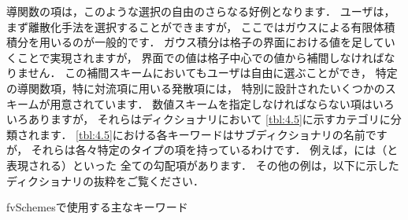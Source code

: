 導関数の項は，このような選択の自由のさらなる好例となります．
ユーザは，まず離散化手法を選択することができますが，
ここではガウスによる有限体積積分を用いるのが一般的です．
ガウス積分は格子の界面における値を足していくことで実現されますが，
界面での値は格子中心での値から補間しなければなりません．
この補間スキームにおいてもユーザは自由に選ぶことができ，
特定の導関数項，特に対流項に用いる発散項には，
特別に設計されたいくつかのスキームが用意されています．
数値スキームを指定しなければならない項はいろいろありますが，
それらはディクショナリにおいて
\autoref{tbl:4.5}に示すカテゴリに分類されます．
\autoref{tbl:4.5}における各キーワードはサブディクショナリの名前ですが，
それらは各々特定のタイプの項を持っているわけです．
例えば，には（と表現される）といった
全ての勾配項があります．
その他の例は，以下に示した
%
%
ディクショナリの抜粋をご覧ください．


\begin{table}[ht]
 
 \caption{fvSchemesで使用する主なキーワード}
 \label{tbl:4.5}
\end{table}


